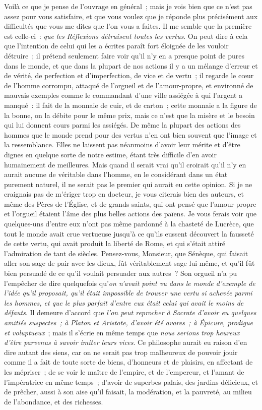 \documentclass[french,twoside]{book} %
\begin{document}
\noindent Voilà ce que je pense de l’ouvrage en général ; mais je vois bien que ce n’est pas assez pour vous satisfaire, et que vous voulez que je réponde plus précisément aux difficultés que vous me dites que l’on vous a faites. Il me semble que la première est celle-ci : {\itshape que les Réflexions détruisent toutes les vertus}. On peut dire à cela que l’intention de celui qui les a écrites paraît fort éloignée de les vouloir détruire ; il prétend seulement faire voir qu’il n’y en a presque point de pures dans le monde, et que dans la plupart de nos actions il y a un mélange d’erreur et de vérité, de perfection et d’imperfection, de vice et de vertu ; il regarde le cœur de l’homme corrompu, attaqué de l’orgueil et de l’amour-propre, et environné de mauvais exemples comme le commandant d’une ville assiégée à qui l’argent a manqué : il fait de la monnaie de cuir, et de carton ; cette monnaie a la figure de la bonne, on la débite pour le même prix, mais ce n’est que la misère et le besoin qui lui donnent cours parmi les assiégés. De même la plupart des actions des hommes que le monde prend pour des vertus n’en ont bien souvent que l’image et la ressemblance. Elles ne laissent pas néanmoins d’avoir leur mérite et d’être dignes en quelque sorte de notre estime, étant très difficile d’en avoir humainement de meilleures. Mais quand il serait vrai qu’il croirait qu’il n’y en aurait aucune de véritable dans l’homme, en le considérant dans un état purement naturel, il ne serait pas le premier qui aurait eu cette opinion. Si je ne craignais pas de m’ériger trop en docteur, je vous citerais bien des auteurs, et même des Pères de l’Église, et de grands saints, qui ont pensé que l’amour-propre et l’orgueil étaient l’âme des plus belles actions des païens. Je vous ferais voir que quelques-uns d’entre eux n’ont pas même pardonné à la chasteté de Lucrèce, que tout le monde avait crue vertueuse jusqu’à ce qu’ils eussent découvert la fausseté de cette vertu, qui avait produit la liberté de Rome, et qui s’était attiré l’admiration de tant de siècles. Pensez-vous, Monsieur, que Sénèque, qui faisait aller son sage de pair avec les dieux, fût véritablement sage lui-même, et qu’il fût bien persuadé de ce qu’il voulait persuader aux autres ? Son orgueil n’a pu l’empêcher de dire quelquefois qu’{\itshape on n’avait point vu dans le monde d’exemple de l’idée qu’il proposait, qu’il était impossible de trouver une vertu si achevée parmi les hommes, et que le plus parfait d’entre eux était celui qui avait le moins de défauts}. Il demeure d’accord que {\itshape l’on peut reprocher à Socrate d’avoir eu quelques amitiés suspectes ; à Platon et Aristote, d’avoir été avares ; à Épicure, prodigue et voluptueux} ; mais il s’écrie en même temps que {\itshape nous serions trop heureux d’être parvenus à savoir imiter leurs vices}. Ce philosophe aurait eu raison d’en dire autant des siens, car on ne serait pas trop malheureux de pouvoir jouir comme il a fait de toute sorte de biens, d’honneurs et de plaisirs, en affectant de les mépriser ; de se voir le maître de l’empire, et de l’empereur, et l’amant de l’impératrice en même temps ; d’avoir de superbes palais, des jardins délicieux, et de prêcher, aussi à son aise qu’il faisait, la modération, et la pauvreté, au milieu de l’abondance, et des richesses. 
\end{document}
